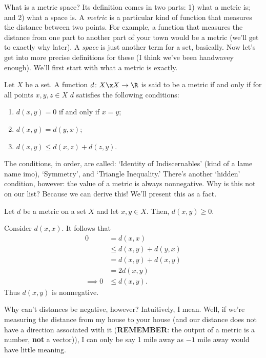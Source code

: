 \documentclass[class=article, crop=false]{standalone}
\begin{document}
What is a metric space? Its definition comes in two parts: 1) what a metric is; and 2) what a space is. A \textit{metric} is a particular kind of function that measures the distance between two points. For example, a function that measures the distance from one part to another part of your town would be a metric (we'll get to exactly why later). A \textit{space} is just another term for a set, basically. Now let's get into more precise definitions for these (I think we've been handwavey enough). We'll first start with what a metric is exactly.
\begin{defn}[Metric]
    Let $X$ be a set. A function $d \colon X \x X \to \R$ is said to be a metric if and only if for all points $x,y,z \in X$ $d$ satisfies the following conditions:
        \begin{enumerate}[\normalfont(i)]
            \item $d(x,y) = 0$ if and only if $x=y$;
            \item $d(x,y) = d(y,x)$;
            \item $d(x,y) \leq d(x,z) + d(z,y)$.
        \end{enumerate}
\end{defn}
The conditions, in order, are called: `Identity of Indiscernables' (kind of a lame name imo), `Symmetry', and `Triangle Inequality.' There's another `hidden' condition, however: the value of a metric is always nonnegative. Why is this not on our list? Because we can derive this! We'll present this as a fact.
\begin{fact}
    Let $d$ be a metric on a set $X$ and let $x,y \in X$. Then, $d(x,y) \geq 0$.
\end{fact}
\begin{pf}
    Consider $d(x,x)$. It follows that
        \begin{align*}
            0 &= d(x,x) \tag{by Identity of Indiscernables} \\
                &\leq d(x,y) + d(y,x) \tag{by Triangle Inequality} \\
                &= d(x,y) + d(x,y) \tag{by Symmetry} \\
                &= 2 d(x,y) \\
            \implies 0 &\leq d(x,y).
        \end{align*}
    Thus $d(x,y)$ is nonnegative.
\end{pf}
Why can't distances be negative, however? Intuitively, I mean. Well, if we're measuring the distance from my house to your house (and our distance does not have a direction associated with it (\textbf{REMEMBER}: the output of a metric is a number, \textbf{not} a vector)), I can only be say 1 mile away as $-1$ mile away would have little meaning.
\end{document}
